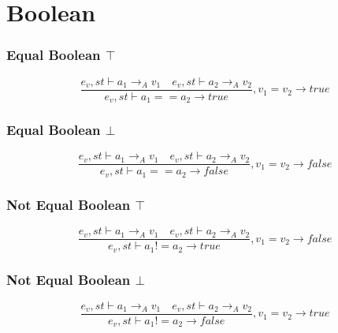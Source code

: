 \section*{Boolean}
\subsubsection{Equal Boolean $\top$}
\begin{equation}
	\frac { { e }_{ v },st\vdash { a }_{ 1 }{ \rightarrow  }_{ A }{ v }_{ 1 }\quad { e }_{ v },st\vdash { a }_{ 2 }{ \rightarrow  }_{ A }{ v }_{ 2 } }{ { e }_{ v },st\vdash { a }_{ 1 }=={ a }_{ 2 }{ \rightarrow  }true } ,{ v }_{ 1 }={ v }_{ 2 }\rightarrow true
\end{equation}

\subsubsection{Equal Boolean $\bot$}
\begin{equation}
	\frac { { e }_{ v },st\vdash { a }_{ 1 }{ \rightarrow  }_{ A }{ v }_{ 1 }\quad { e }_{ v },st\vdash { a }_{ 2 }{ \rightarrow  }_{ A }{ v }_{ 2 } }{ { e }_{ v },st\vdash { a }_{ 1 }=={ a }_{ 2 }{ \rightarrow  }false } ,{ v }_{ 1 }={ v }_{ 2 }\rightarrow false
\end{equation}

\subsubsection{Not Equal Boolean $\top$}
\begin{equation}
	\frac { { e }_{ v },st\vdash { a }_{ 1 }{ \rightarrow  }_{ A }{ v }_{ 1 }\quad { e }_{ v },st\vdash { a }_{ 2 }{ \rightarrow  }_{ A }{ v }_{ 2 } }{ { e }_{ v },st\vdash { a }_{ 1 }!={ a }_{ 2 }{ \rightarrow  }true } ,{ v }_{ 1 }={ v }_{ 2 }\rightarrow false
\end{equation}

\subsubsection{Not Equal Boolean $\bot$}
\begin{equation}
	\frac { { e }_{ v },st\vdash { a }_{ 1 }{ \rightarrow  }_{ A }{ v }_{ 1 }\quad { e }_{ v },st\vdash { a }_{ 2 }{ \rightarrow  }_{ A }{ v }_{ 2 } }{ { e }_{ v },st\vdash { a }_{ 1 }!={ a }_{ 2 }{ \rightarrow  }false } ,{ v }_{ 1 }={ v }_{ 2 }\rightarrow true
\end{equation}

